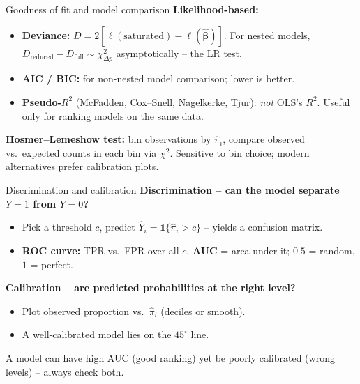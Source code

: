 \documentclass[10pt,ignorenonframetext,aspectratio=169]{beamer}
\newcommand{\bbeta}{\boldsymbol{\beta}}
\begin{document}
\begin{frame}{Goodness of fit and model comparison}
\textbf{Likelihood-based:}
\begin{itemize}
    \justifying
    \item \textbf{Deviance:} $D = 2\!\left[\ell(\text{saturated}) - \ell(\hat{\bbeta})\right]$. For nested models, $D_{\text{reduced}} - D_{\text{full}} \sim \chi^2_{\Delta p}$ asymptotically -- the LR test.
    \item \textbf{AIC / BIC:} for non-nested model comparison; lower is better.
    \item \textbf{Pseudo-$R^2$} (McFadden, Cox--Snell, Nagelkerke, Tjur): \emph{not} OLS's $R^2$. Useful only for ranking models on the same data.
\end{itemize}

\medskip
\textbf{Hosmer--Lemeshow test:} bin observations by $\hat{\pi}_i$, compare observed vs.\ expected counts in each bin via $\chi^2$. Sensitive to bin choice; modern alternatives prefer calibration plots.
\end{frame}


\begin{frame}{Discrimination and calibration}
\textbf{Discrimination -- can the model separate $Y=1$ from $Y=0$?}
\begin{itemize}
    \justifying
    \item Pick a threshold $c$, predict $\hat{Y}_i = \mathbb{1}\{\hat{\pi}_i > c\}$ -- yields a confusion matrix.
    \item \textbf{ROC curve:} TPR vs.\ FPR over all $c$. \textbf{AUC} = area under it; $0.5$ = random, $1$ = perfect.
\end{itemize}

\medskip
\textbf{Calibration -- are predicted probabilities at the right level?}
\begin{itemize}
    \justifying
    \item Plot observed proportion vs.\ $\hat{\pi}_i$ (deciles or smooth).
    \item A well-calibrated model lies on the $45^\circ$ line.
\end{itemize}

\medskip
A model can have high AUC (good ranking) yet be poorly calibrated (wrong levels) -- always check both.
\end{frame}
\end{document}
